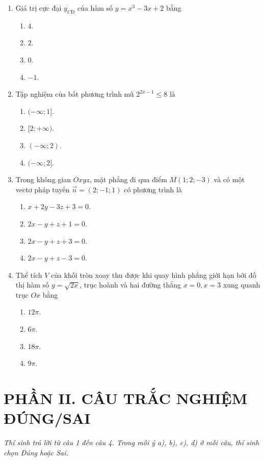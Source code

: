 \documentclass[12pt,a4paper]{article}
\begin{document}
\begin{enumerate}[label=\textbf{Câu \arabic*:}, leftmargin=*]
\item Giá trị cực đại $y_{CĐ}$ của hàm số $y = x^3 - 3x + 2$ bằng
\begin{enumerate}[label=\Alph*.]
    \item $4$.
    \item $2$.
    \item $0$.
    \item $-1$.
\end{enumerate}

\item Tập nghiệm của bất phương trình mũ $2^{2x - 1} \le 8$ là
\begin{enumerate}[label=\Alph*.]
    \item $(-\infty; 1]$.
    \item $[2; +\infty)$.
    \item $(-\infty; 2)$.
    \item $(-\infty; 2]$.
\end{enumerate}

\item Trong không gian $Oxyz$, mặt phẳng đi qua điểm $M(1; 2; -3)$ và có một vectơ pháp tuyến $\vec{n} = (2; -1; 1)$ có phương trình là
\begin{enumerate}[label=\Alph*.]
    \item $x + 2y - 3z + 3 = 0$.
    \item $2x - y + z + 1 = 0$.
    \item $2x - y + z + 3 = 0$.
    \item $2x - y + z - 3 = 0$.
\end{enumerate}

\item Thể tích $V$ của khối tròn xoay thu được khi quay hình phẳng giới hạn bởi đồ thị hàm số $y = \sqrt{2x}$, trục hoành và hai đường thẳng $x = 0, x = 3$ xung quanh trục $Ox$ bằng
\begin{enumerate}[label=\Alph*.]
    \item $12\pi$.
    \item $6\pi$.
    \item $18\pi$.
    \item $9\pi$.
\end{enumerate}

\end{enumerate}

\section*{PHẦN II. CÂU TRẮC NGHIỆM ĐÚNG/SAI}
\textit{Thí sinh trả lời từ câu 1 đến câu 4. Trong mỗi ý a), b), c), d) ở mỗi câu, thí sinh chọn Đúng hoặc Sai.}
\end{document}
